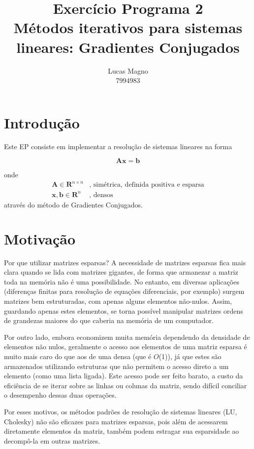 \documentclass[a4paper,11pt]{article}
\date{}
\author{Lucas Magno \\ 7994983}
\title{Exercício Programa 2 \\ Métodos iterativos para sistemas lineares: Gradientes Conjugados}
\begin{document}
    \maketitle

    \section*{Introdução}
    Este EP consiste em implementar a resolução de sistemas lineares na forma

    $$ \mathbf{Ax} = \mathbf{b} $$

    onde
    \begin{align*}
        \mathbf{A} \in \mathbf{R}^{n\times n} & \text{, simétrica, definida positiva e esparsa} \\
        \mathbf{x}, \mathbf{b}\in \mathbf{R}^{n} & \text{, densos}
    \end{align*}
    através do método de Gradientes Conjugados.

    \section*{Motivação}
    Por que utilizar matrizes esparsas?
    A necessidade de matrizes esparsas fica mais clara quando se lida com matrizes gigantes,
    de forma que armanezar a matriz toda na memória não é uma possibilidade. No entanto,
    em diversas aplicações (diferenças finitas para resolução de equações diferenciais, por exemplo)
    surgem matrizes bem estruturadas, com apenas alguns elementos não-nulos. Assim, guardando
    apenas estes elementos, se torna possível manipular matrizes ordens de grandezas maiores
    do que caberia na memória de um computador.

    Por outro lado, embora economizem muita memória dependendo da densidade de elementos
    não nulos, geralmente o acesso aos elementos de uma matriz esparsa é muito mais caro do que aos
    de uma densa (que é $O$(1)), já que estes são armazenados utilizando estruturas que não
    permitem o acesso direto a um elemento (como uma lista ligada). Este acesso pode ser
    feito barato, a custo da eficiência de se iterar sobre as linhas ou colunas da matriz,
    sendo difícil conciliar o desempenho dessas duas operações.

    Por esses motivos, os métodos padrões de resolução de sistemas lineares (LU, Cholesky)
    não são eficazes para matrizes esparsas, pois além de acessarem diretamente elementos
    da matriz, também podem estragar sua esparsidade ao decompô-la em outras matrizes.
\end{document}
